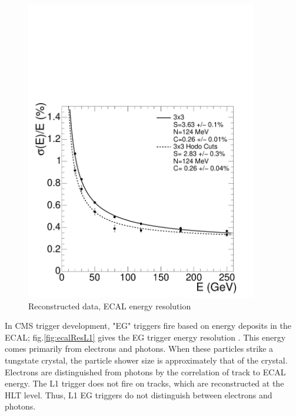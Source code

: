 \begin{figure}[]
\begin{centering}
\includegraphics[width=4in]{Chapter3/importfigs/Figure_001-007.pdf}
\par\end{centering}
\caption{Reconstructed data, ECAL energy resolution \cite{Bayatian:2006nff} \label{fig:ecalRes}}
\end{figure}
 
In CMS trigger development, "EG" triggers fire based on energy deposits in the ECAL; fig.\ref{fig:ecalResL1} gives the EG trigger energy resolution \cite{Bayatian:2006nff}. This energy comes primarily from electrons and photons. When these particles strike a tungstate crystal, the particle shower size is approximately that of the crystal. Electrons are distinguished from photons by the correlation of track to ECAL energy. The L1 trigger does not fire on tracks, which are reconstructed at the HLT level. Thus, L1 EG triggers do not distinguish between electrons and photons. 

